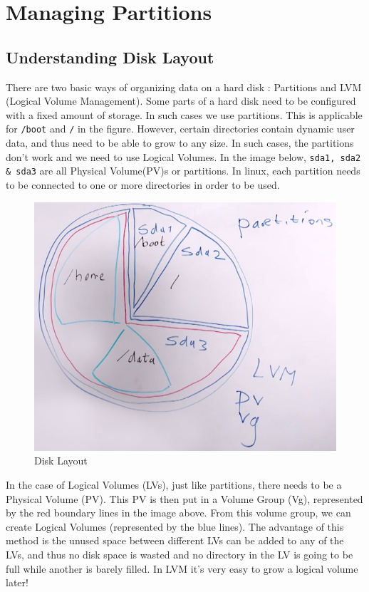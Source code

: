 \chapter{Managing Partitions}

\section{Understanding Disk Layout}
There are two basic ways of organizing data on a hard disk : Partitions and LVM (Logical Volume Management). Some parts of a hard disk need to be configured with a fixed amount of storage. In such cases we use partitions. This is applicable for \verb|/boot| and \verb|/| in the figure. However, certain directories contain dynamic user data, and thus need to be able to grow to any size. In such cases, the partitions don't work and we need to use Logical Volumes. In the image below, \verb|sda1, sda2 & sda3| are all Physical Volume(PV)s or partitions. In linux, each partition needs to be connected to one or more directories in order to be used. 

\begin{figure}[H]
	\centering
	\includegraphics[width=0.9\linewidth]{Mod2/chapters/2.15.a}
	\caption{Disk Layout}
	\label{fig:2 Disk Layout}
\end{figure}


In the case of Logical Volumes (LVs), just like partitions, there needs to be a Physical Volume (PV). This PV is then put in a Volume Group (Vg), represented by the red boundary lines in the image above. From this volume group, we can create Logical Volumes (represented by the blue lines). The advantage of this method is the unused space between different LVs can be added to any of the LVs, and thus no disk space is wasted and no directory in the LV is going to be full while another is barely filled. In LVM it's very easy to grow a logical volume later!

